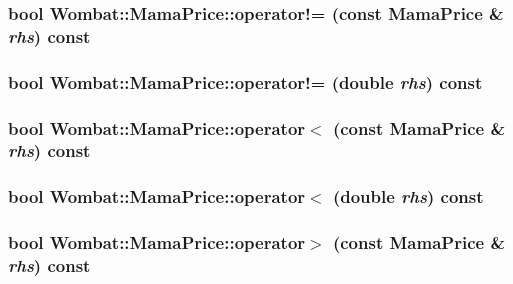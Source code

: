\label{classWombat_1_1MamaPrice_aa5ec5a6cedaee2998ebec7e08515b27c}
\hypertarget{classWombat_1_1MamaPrice_a6ab9360ae864e9f16b88118b37db36ef}{
\subsubsection[{operator!=}]{\setlength{\rightskip}{0pt plus 5cm}bool Wombat::MamaPrice::operator!= (const {\bf MamaPrice} \& {\em rhs}) const}}
\label{classWombat_1_1MamaPrice_a6ab9360ae864e9f16b88118b37db36ef}
\hypertarget{classWombat_1_1MamaPrice_a79eb672210ac523c911a16116bf834cd}{
\subsubsection[{operator!=}]{\setlength{\rightskip}{0pt plus 5cm}bool Wombat::MamaPrice::operator!= (double {\em rhs}) const}}
\label{classWombat_1_1MamaPrice_a79eb672210ac523c911a16116bf834cd}
\hypertarget{classWombat_1_1MamaPrice_a75a7c77e3b6aa23bd4c83d8983d55a06}{
\subsubsection[{operator$<$}]{\setlength{\rightskip}{0pt plus 5cm}bool Wombat::MamaPrice::operator$<$ (const {\bf MamaPrice} \& {\em rhs}) const}}
\label{classWombat_1_1MamaPrice_a75a7c77e3b6aa23bd4c83d8983d55a06}
\hypertarget{classWombat_1_1MamaPrice_a78bd049e500408f2f9cd82349c157653}{
\subsubsection[{operator$<$}]{\setlength{\rightskip}{0pt plus 5cm}bool Wombat::MamaPrice::operator$<$ (double {\em rhs}) const}}
\label{classWombat_1_1MamaPrice_a78bd049e500408f2f9cd82349c157653}
\hypertarget{classWombat_1_1MamaPrice_a15247a3fd3b5ec23532836f0f1a543e3}{
\subsubsection[{operator$>$}]{\setlength{\rightskip}{0pt plus 5cm}bool Wombat::MamaPrice::operator$>$ (const {\bf MamaPrice} \& {\em rhs}) const}}
